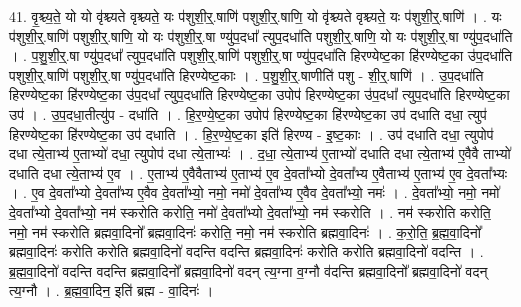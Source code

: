 \documentclass[17pt]{extarticle}
\begin{document}
41. वृ॒श्च्य॒ते॒ यो यो वृ॑श्च्यते वृश्च्यते॒ यः प॑शुशी॒र्॒.षाणि॑ पशुशी॒र्॒.षाणि॒ यो वृ॑श्च्यते वृश्च्यते॒ यः प॑शुशी॒र्॒.षाणि॑ । . यः प॑शुशी॒र्॒.षाणि॑ पशुशी॒र्॒.षाणि॒ यो यः प॑शुशी॒र्॒.षा ण्यु॑प॒दधा᳚ त्युप॒दधा॑ति पशुशी॒र्॒.षाणि॒ यो यः प॑शुशी॒र्॒.षा ण्यु॑प॒दधा॑ति । . प॒शु॒शी॒र्॒.षा ण्यु॑प॒दधा᳚ त्युप॒दधा॑ति पशुशी॒र्॒.षाणि॑ पशुशी॒र्॒.षा ण्यु॑प॒दधा॑ति हिरण्येष्ट॒का हि॑रण्येष्ट॒का उ॑प॒दधा॑ति पशुशी॒र्॒.षाणि॑ पशुशी॒र्॒.षा ण्यु॑प॒दधा॑ति हिरण्येष्ट॒काः । . प॒शु॒शी॒र्॒.षाणीति॑ पशु - शी॒र्॒.षाणि॑ । . उ॒प॒दधा॑ति हिरण्येष्ट॒का हि॑रण्येष्ट॒का उ॑प॒दधा᳚ त्युप॒दधा॑ति हिरण्येष्ट॒का उपोप॑ हिरण्येष्ट॒का उ॑प॒दधा᳚ त्युप॒दधा॑ति हिरण्येष्ट॒का उप॑ । . उ॒प॒दधा॒तीत्यु॑प - दधा॑ति । . हि॒र॒ण्ये॒ष्ट॒का उपोप॑ हिरण्येष्ट॒का हि॑रण्येष्ट॒का उप॑ दधाति दधा॒ त्युप॑ हिरण्येष्ट॒का हि॑रण्येष्ट॒का उप॑ दधाति । . हि॒र॒ण्ये॒ष्ट॒का इति॑ हिरण्य - इ॒ष्ट॒काः । . उप॑ दधाति दधा॒ त्युपोप॑ दधा त्ये॒ताभ्य॑ ए॒ताभ्यो॑ दधा॒ त्युपोप॑ दधा त्ये॒ताभ्यः॑ । . द॒धा॒ त्ये॒ताभ्य॑ ए॒ताभ्यो॑ दधाति दधा त्ये॒ताभ्य॑ ए॒वैवै ताभ्यो॑ दधाति दधा त्ये॒ताभ्य॑ ए॒व । . ए॒ताभ्य॑ ए॒वैवैताभ्य॑ ए॒ताभ्य॑ ए॒व दे॒वता᳚भ्यो दे॒वता᳚भ्य ए॒वैताभ्य॑ ए॒ताभ्य॑ ए॒व दे॒वता᳚भ्यः । . ए॒व दे॒वता᳚भ्यो दे॒वता᳚भ्य ए॒वैव दे॒वता᳚भ्यो॒ नमो॒ नमो॑ दे॒वता᳚भ्य ए॒वैव दे॒वता᳚भ्यो॒ नमः॑ । . दे॒वता᳚भ्यो॒ नमो॒ नमो॑ दे॒वता᳚भ्यो दे॒वता᳚भ्यो॒ नम॑ स्करोति करोति॒ नमो॑ दे॒वता᳚भ्यो दे॒वता᳚भ्यो॒ नम॑
स्करोति । . नम॑ स्करोति करोति॒ नमो॒ नम॑ स्करोति ब्रह्मवा॒दिनो᳚ ब्रह्मवा॒दिनः॑ करोति॒ नमो॒ नम॑ स्करोति ब्रह्मवा॒दिनः॑ । . क॒रो॒ति॒ ब्र॒ह्म॒वा॒दिनो᳚ ब्रह्मवा॒दिनः॑ करोति करोति ब्रह्मवा॒दिनो॑ वदन्ति वदन्ति ब्रह्मवा॒दिनः॑ करोति करोति ब्रह्मवा॒दिनो॑ वदन्ति । . ब्र॒ह्म॒वा॒दिनो॑ वदन्ति वदन्ति ब्रह्मवा॒दिनो᳚ ब्रह्मवा॒दिनो॑ वदन् त्य॒ग्ना व॒ग्नौ व॑दन्ति ब्रह्मवा॒दिनो᳚ ब्रह्मवा॒दिनो॑ वदन् त्य॒ग्नौ । . ब्र॒ह्म॒वा॒दिन॒ इति॑ ब्रह्म - वा॒दिनः॑ । \newline
\pagebreak
{}
\end{document}
